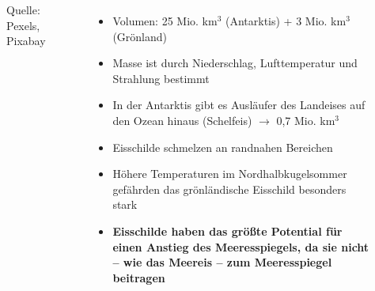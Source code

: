 \begin{frame}
\begin{columns}
\begin{figure}
      \caption{Quelle: Pexels, Pixabay}
    \end{figure}
	\begin{itemize}
		\item Volumen: 25 Mio. km$^3$ (Antarktis) + 3 Mio. km$^3$ (Grönland)
		\item Masse ist durch Niederschlag, Lufttemperatur und Strahlung bestimmt
		\item In der Antarktis gibt es Ausläufer des Landeises auf den Ozean hinaus (Schelfeis) $\rightarrow$ 0,7 Mio. km$^3$
		\item Eisschilde schmelzen an randnahen Bereichen
		\item Höhere Temperaturen im Nordhalbkugelsommer gefährden das grönländische Eisschild besonders stark
		\item \textbf{Eisschilde haben das größte Potential für einen Anstieg des Meeresspiegels, da sie nicht -- wie das Meereis -- zum Meeresspiegel beitragen}
	\end{itemize}
  \end{columns}

\end{frame}

